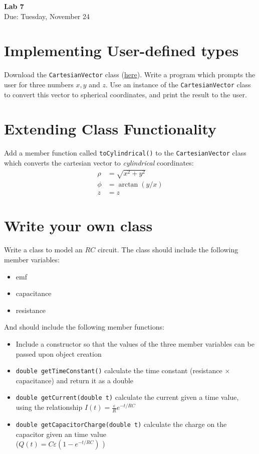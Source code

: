 \documentclass{article}
\begin{document}
\fancyfoot[C]{\thepage}
\vspace*{0cm}
\begin{center}
	{\LARGE \textbf{Lab 7}}\\
	\vspace{0.25cm}
	{\Large Due: Tuesday, November 24}
\end{center}

\section{Implementing User-defined types}
Download the \texttt{CartesianVector} class (\href{https://drive.google.com/file/d/1kgaPRark_O-LV8gCDP4g88czcgZm4rvj/view?usp=sharing}{here}). Write a program which prompts the user for three numbers $x,y$ and $z$. Use an instance of the \texttt{CartesianVector} class to convert this vector to spherical coordinates, and print the result to the user.
\section{Extending Class Functionality}
Add a member function called \texttt{toCylindrical()} to the \texttt{CartesianVector} class which converts the cartesian vector to \textit{cylindrical} coordinates:
\begin{align*}
	\rho &= \sqrt{x^2+y^2}\\
	\phi &= \arctan(y/x)\\
	z&=z
\end{align*}
\section{Write your own class}
Write a class to model an $RC$ circuit.
The class should include the following member variables:
\begin{itemize}
	\item emf
	\item capacitance
	\item resistance
\end{itemize}
And should include the following member functions:
\begin{itemize}
	\item Include a constructor so that the values of the three member variables can be passed upon object creation
	\item \texttt{double getTimeConstant()} calculate the time constant (resistance $\times$ capacitance) and return it as a double
	\item \texttt{double getCurrent(double t)} calculate the current given a time value, using the relationship $I(t)=\frac{\varepsilon}{R}e^{-t/RC}$
	\item \texttt{double getCapacitorCharge(double t)} calculate the charge on the capacitor given an time value \\($Q(t)=C\varepsilon\left(1-e^{-t/RC}\right)$ )
\end{itemize}
\end{document}
